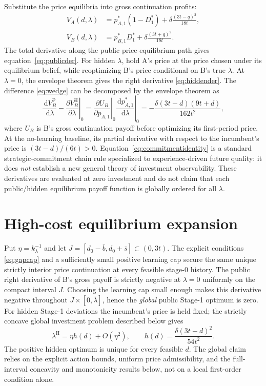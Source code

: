 \documentclass[11pt,a4paper]{article}
\numberwithin{equation}{section}
\theoremstyle{remark}
\newcommand{\PP}{\mathrm{P}}
\newcommand{\HH}{\mathrm{H}}
\newcommand{\kl}{k_{\lambda}}
\newcommand{\dd}{\,\mathrm{d}}
\begin{document}
Substitute the price equilibria into gross continuation profits:
\begin{align*}
V_A(d,\lambda)&=p_{A,1}^*(1-D_1^*)+
 \delta\frac{(3t-q)^2}{18t},\\
V_B(d,\lambda)&=p_{B,1}^*D_1^*+
 \delta\frac{(3t+q)^2}{18t}.
\end{align*}
The total derivative along the public price-equilibrium path gives equation~\eqref{eq:publicder}. For hidden $\lambda$, hold A's price at the price chosen under its equilibrium belief, while reoptimizing B's price conditional on B's true $\lambda$. At $\lambda=0$, the envelope theorem gives the right derivative \eqref{eq:hiddender}. The difference \eqref{eq:wedge} can be decomposed by the envelope theorem as
\begin{equation}
\left.\frac{\dd V_B^{\PP}}{\dd\lambda}-
\frac{\partial V_B^{\HH}}{\partial\lambda}\right|_0
=\left.\frac{\partial U_B}{\partial p_{A,1}}\right|_0
\left.\frac{\dd p_{A,1}^*}{\dd\lambda}\right|_0
=-\frac{\delta(3t-d)(9t+d)}{162t^2},
\label{eq:commitmentidentity}
\end{equation}
where $U_B$ is B's gross continuation payoff before optimizing its first-period price. At the no-learning baseline, its partial derivative with respect to the incumbent's price is $(3t-d)/(6t)>0$. Equation~\eqref{eq:commitmentidentity} is a standard strategic-commitment chain rule specialized to experience-driven future quality: it does \emph{not} establish a new general theory of investment observability. These derivatives are evaluated at zero investment and do not claim that each public/hidden equilibrium payoff function is globally ordered for all $\lambda$.

\section{High-cost equilibrium expansion}\label{app:investment}

Put $\eta=\kl^{-1}$ and let $J=[d_0-\bar b,d_0+\bar s]\subset(0,3t)$. The explicit conditions \eqref{eq:gapcap} and a sufficiently small positive learning cap secure the same unique strictly interior price continuation at every feasible stage-0 history. The public right derivative of B's gross payoff is strictly negative at $\lambda=0$ uniformly on the compact interval $J$. Choosing the learning cap small enough makes this derivative negative throughout $J\times[0,\bar\lambda]$, hence the \emph{global} public Stage-1 optimum is zero. For hidden Stage-1 deviations the incumbent's price is held fixed; the strictly concave global investment problem described below gives
\[
\lambda^{\HH}=\eta h(d)+O(\eta^2),\qquad
h(d)=\frac{\delta(3t-d)^2}{54t^2}.
\]
The positive hidden optimum is unique for every feasible $d$. The global claim relies on the explicit action bounds, uniform price admissibility, and the full-interval concavity and monotonicity results below, not on a local first-order condition alone.
\end{document}
